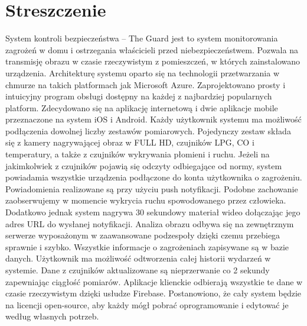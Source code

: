 \chapter{Streszczenie}

System kontroli bezpieczeństwa – The Guard jest to system monitorowania zagrożeń w domu i ostrzegania właścicieli przed niebezpieczeństwem. Pozwala na transmisję obrazu w czasie rzeczywistym z pomieszczeń, w których zainstalowano urządzenia. Architekturę systemu oparto się na technologii przetwarzania w chmurze na takich platformach jak Microsoft Azure. Zaprojektowano prosty i intuicyjny program obsługi dostępny na każdej z najbardziej popularnych platform. Zdecydowano się na aplikację internetową i dwie aplikacje mobile przeznaczone na system iOS i Android. Każdy użytkownik systemu ma możliwość podłączenia dowolnej liczby zestawów pomiarowych. Pojedynczy zestaw składa się z kamery nagrywającej obraz w FULL HD, czujników LPG, CO i temperatury, a także z czujników wykrywania płomieni i ruchu. Jeżeli na jakimkolwiek z czujników pojawią się odczyty odbiegające od normy, system powiadamia wszystkie urządzenia podłączone do konta użytkownika o zagrożeniu. Powiadomienia realizowane są przy użyciu push notyfikacji. 
Podobne zachowanie zaobserwujemy w momencie wykrycia ruchu spowodowanego przez człowieka. Dodatkowo jednak system nagrywa 30 sekundowy materiał wideo dołączając jego adres URL do wysłanej notyfikacji. Analiza obrazu odbywa się na zewnętrznym serwerze wyposażonym w zaawansowane podzespoły dzięki czemu przebiega sprawnie i szybko. Wszystkie informacje o zagrożeniach zapisywane są w bazie danych. Użytkownik ma możliwość odtworzenia całej historii wydarzeń w systemie. Dane z czujników aktualizowane są nieprzerwanie co 2 sekundy zapewniając ciągłość pomiarów. Aplikacje klienckie odbierają wszystkie te dane w czasie rzeczywistym dzięki usłudze Firebase. Postanowiono, że cały system będzie na licencji open-source, aby każdy mógł pobrać oprogramowanie i edytować je według własnych potrzeb.


